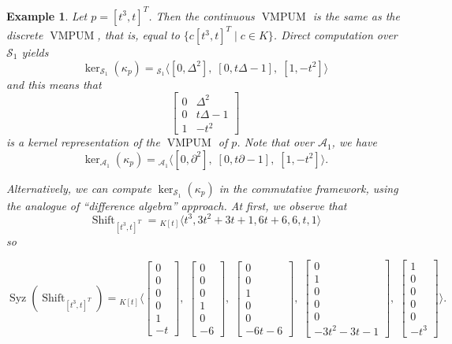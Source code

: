 \documentclass[a4paper,10pt]{article}
\newtheorem{ex}[Th]{Example}
\theoremstyle{nonumberplain}
\renewcommand{\d}{\partial}
\DeclareMathOperator{\VMPUM}{VMPUM}
\DeclareMathOperator{\Shift}{Shift}
\DeclareMathOperator{\Syz}{Syz}
\begin{document}
\begin{ex}
\label{exKerP}
 Let $p=[t^3, t]^{T}$. 
Then the continuous $\VMPUM$ is the same as the discrete $\VMPUM$, that is, 
equal to $\{ c [t^3, t]^{T} \mid c\in K\}$. Direct computation over $\mathcal{S}_1$ yields 
$$ \ker_{\mathcal{S}_1}(\kappa_p) = {}_{\mathcal{S}_1}\langle [0, \Delta^2], \; [0, t\Delta-1], \;  [1, -t^2] \rangle$$
and this means that 
$$
\left[ 
\begin{array}{cc}
0 & \Delta^2 \\ 0 & t\Delta-1 \\ 1 & -t^2
\end{array}
\right] 
$$
is a kernel representation of the $\VMPUM$ of $p$. 
Note that over $\mathcal{A}_1$,
we have
$$ \ker_{\mathcal{A}_1}(\kappa_p) = {}_{\mathcal{A}_1}\langle [0, \d^2], \; [0, t\d -1], \;  [1, -t^2] \rangle.$$

Alternatively, we can compute $ \ker_{\mathcal{S}_1}(\kappa_p)$ in the commutative framework, using the analogue of ``difference algebra'' approach. At first, we observe that
$$ 
\Shift_{ [t^3, t]^{T}}= {}_{K[t]} \langle t^3, 3t^2+3t+1, 6t+6, 6, t, 1 \rangle
$$
so 
\begin{footnotesize}
$$
\Syz(\Shift_{ [t^3, t]^{T}})= {}_{K[t]} \langle  
\left[ \begin{array}{c}
0\\0\\0\\0\\1\\-t
\end{array}
\right] ,\;
\left[ \begin{array}{c}
0\\0\\0\\1\\0\\-6
\end{array}
\right] ,\;
\left[ \begin{array}{c}
0\\0\\1\\0\\0\\-6t-6
\end{array}
\right] ,\;
\left[ \begin{array}{c}
0\\1\\0\\0\\0\\-3t^2-3t-1
\end{array}
\right] ,\;
\left[ \begin{array}{c}
1\\0\\0\\0\\0\\-t^3
\end{array}
\right]
\rangle .
$$
\end{footnotesize}


\end{ex}
\end{document}
